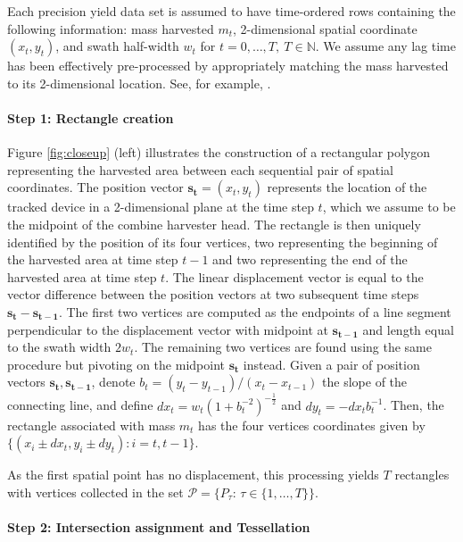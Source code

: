 \documentclass[12pt]{article}
\begin{document}
Each precision yield data set is assumed to have time-ordered rows
containing the following information: mass harvested $m_t$,
2-dimensional spatial coordinate $(x_t,y_t)$, and swath half-width
$w_t$ for $t=0,\ldots,T, \ T \in \mathbb{N}$.  We assume any lag time
has been effectively pre-processed by appropriately matching the mass
harvested to its 2-dimensional location. See, for example,
\cite{Burks2004, Hemming2005, Sudduth2007, Sudduth2012}.

\paragraph*{Step 1: Rectangle creation}

Figure \ref{fig:closeup} (left) illustrates the construction of a
rectangular polygon representing the harvested area between each
sequential pair of spatial coordinates. The position vector
$\mathbf{s_t} = (x_{t}, y_{t})$ represents the location of the tracked
device in a 2-dimensional plane at the time step $t$, which we assume
to be the midpoint of the combine harvester head. The rectangle is
then uniquely identified by the position of its four vertices, two
representing the beginning of the harvested area at time step $t-1$
and two representing the end of the harvested area at time step
$t$. The linear displacement vector is equal to the vector difference
between the position vectors at two subsequent time steps
$\mathbf{s_t} - \mathbf{s_{t-1}}$. The first two vertices are computed
as the endpoints of a line segment perpendicular to the displacement
vector with midpoint at $\mathbf{s_{t-1}}$ and length equal to the
swath width $2 w_t$. The remaining two vertices are found using the
same procedure but pivoting on the midpoint $\mathbf{s_t}$
instead. Given a pair of position vectors
$\mathbf{s_t}, \mathbf{s_{t-1}}$, denote
$b_t = (y_t - y_{t-1}) / (x_t - x_{t-1})$ the slope of the connecting
line, and define $dx_t = w_t (1 + b_t^{-2})^{-\frac{1}{2}}$ and
$dy_t = - dx_t b_t^{-1}$. Then, the rectangle associated with mass
$m_t$ has the four vertices coordinates given by
$\{(x_{i} \pm dx_t, y_{i} \pm dy_t): i = t, t-1\}$.

As the first spatial point has no displacement, this processing yields
$T$ rectangles with vertices collected in the set
$\mathcal{P} = \{P_{\tau}$: $\tau \in \{1, \dots, T\}\}$.

\paragraph{Step 2: Intersection assignment and Tessellation}
\end{document}
